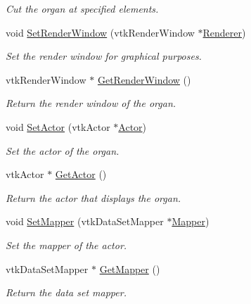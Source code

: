 \begin{DoxyCompactItemize}
\begin{DoxyCompactList}\small\item\em Cut the organ at specified elements. \item\end{DoxyCompactList}\item 
void \hyperlink{classvtkOrgan_a2b6a862da0f1ca6cd192138cdd00b04b}{SetRenderWindow} (vtkRenderWindow $\ast$\hyperlink{classvtkOrgan_ac9e062f1471c9eb4c10665556c924941}{Renderer})
\begin{DoxyCompactList}\small\item\em Set the render window for graphical purposes. \item\end{DoxyCompactList}\item 
vtkRenderWindow $\ast$ \hyperlink{classvtkOrgan_ae670e2727313073a9659a2795ce64c98}{GetRenderWindow} ()
\begin{DoxyCompactList}\small\item\em Return the render window of the organ. \item\end{DoxyCompactList}\item 
void \hyperlink{classvtkOrgan_a7368fa68add5a80b7b80989df1894233}{SetActor} (vtkActor $\ast$\hyperlink{classvtkOrgan_ab52d491e587bd24a4a22ee27081b9eb0}{Actor})
\begin{DoxyCompactList}\small\item\em Set the actor of the organ. \item\end{DoxyCompactList}\item 
vtkActor $\ast$ \hyperlink{classvtkOrgan_af12bcf578df2448068251a80b08822c1}{GetActor} ()
\begin{DoxyCompactList}\small\item\em Return the actor that displays the organ. \item\end{DoxyCompactList}\item 
void \hyperlink{classvtkOrgan_aefdce585f74966627c2b5c9d01be8fe3}{SetMapper} (vtkDataSetMapper $\ast$\hyperlink{classvtkOrgan_a3bcab5f9352bb68a51d87ad45ab49745}{Mapper})
\begin{DoxyCompactList}\small\item\em Set the mapper of the actor. \item\end{DoxyCompactList}\item 
vtkDataSetMapper $\ast$ \hyperlink{classvtkOrgan_af638d5ed23ec53237ec15089ef5cbadc}{GetMapper} ()
\begin{DoxyCompactList}\small\item\em Return the data set mapper. \item\end{DoxyCompactList}\end{DoxyCompactItemize}
